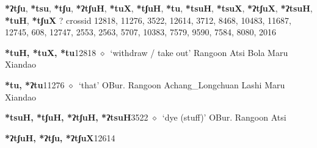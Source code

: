 \item
\textbf{*ʔtʃu}, \textbf{*tsu}, \textbf{*tʃu}, \textbf{*ʔtʃuH}, \textbf{*tuX}, \textbf{*tʃuH}, \textbf{*tu}, \textbf{*tsuH}, \textbf{*tsuX}, \textbf{*ʔtʃuX}, \textbf{*ʔtsuH}, \textbf{*tuH}, \textbf{*tʃuX}
?
  {\tiny crossid 12818, 11276, 3522, 12614, 3712, 8468, 10483, 11687, 12745, 608, 12747, 2553, 2563, 5707, 10383, 7579, 9590, 7584, 8080, 2016}
  \begin{list}{}{\leftmargin=1.5em \itemindent=-1.5em}
  \item {\footnotesize \textbf{*tuH, *tuX, *tu}}{\tiny 12818}
         $\diamond$~`withdraw / take out'
         Rangoon 
\hspace{1ex}
         Atsi 
\hspace{1ex}
         Bola 
\hspace{1ex}
         Maru 
\hspace{1ex}
         Xiandao 
  \item {\footnotesize \textbf{*tu, *ʔtu}}{\tiny 11276}
\hspace{1ex}
         $\diamond$~`that'
         OBur. 
\hspace{1ex}
         Rangoon 
\hspace{1ex}
         Achang\_Longchuan 
\hspace{1ex}
         Lashi 
\hspace{1ex}
         Maru 
\hspace{1ex}
         Xiandao 
  \item {\footnotesize \textbf{*tsuH, *tʃuH, *ʔtʃuH, *ʔtsuH}}{\tiny 3522}
\hspace{1ex}
         $\diamond$~`dye (stuff)'
         OBur. 
\hspace{1ex}
         Rangoon 
\hspace{1ex}
         Atsi 
  \item {\footnotesize \textbf{*ʔtʃuH, *ʔtʃu, *ʔtʃuX}}{\tiny 12614}
\hspace{1ex}

\end{list}
